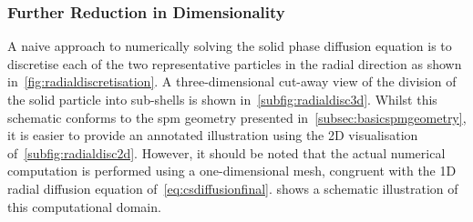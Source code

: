 \subsubsection*{Further Reduction in Dimensionality}\label{subsec:basicspmfurtherdimensionalityreduction}

A  naive approach  to numerically  solving  the solid  phase diffusion  equation
is  to  discretise each  of  the  two  representative  particles in  the  radial
direction  as  shown   in~\cref{fig:radialdiscretisation}.  A  three-dimensional
cut-away view  of the division  of the solid  particle into sub-shells  is shown
in~\cref{subfig:radialdisc3d}. Whilst  this schematic conforms to  the \gls{spm}
geometry presented in~\cref{subsec:basicspmgeometry}, it is easier to provide an
annotated illustration using the 2D visualisation of~\cref{subfig:radialdisc2d}.
However, it should  be noted that the actual numerical  computation is performed
using a  one-dimensional mesh, congruent  with the 1D radial  diffusion equation
of~\cref{eq:csdiffusionfinal}.     shows  a  schematic
illustration of this computational domain.
